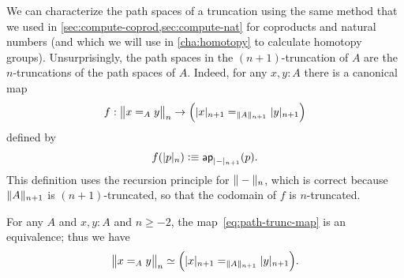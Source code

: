 We can characterize the path spaces of a truncation using the same method that we used in \autoref{sec:compute-coprod,sec:compute-nat} for
coproducts and natural numbers (and which we will use in \autoref{cha:homotopy} to calculate homotopy groups).
Unsurprisingly, the path spaces in the $(n+1)$-truncation of $A$ are the $n$-truncations of the path spaces of $A$.
Indeed, for any $x,y:A$ there is a canonical map
\begin{equation}
  f:\ttrunc n{x=_Ay}\to \Big(\tproj {n+1}x=_{\trunc{n+1}A}\tproj {n+1}y\Big)\label{eq:path-trunc-map}
\end{equation}
defined by
\[f(\tproj n{p})\defeq \apfunc{\tproj {n+1}-}(p). \]
This definition uses the recursion principle for $\trunc n-$, which is correct because $\trunc {n+1}A$ is $(n+1)$-truncated, so that the
codomain of $f$ is $n$-truncated.

\begin{thm} \label{thm:path-truncation}
  For any $A$ and $x,y:A$ and $n\ge -2$, the map~\eqref{eq:path-trunc-map} is an equivalence; thus we have
  \[ \eqv{\ttrunc n{x=_Ay}}{\Big(\tproj {n+1}x=_{\trunc{n+1}A}\tproj {n+1}y\Big)}. \]
\end{thm}

